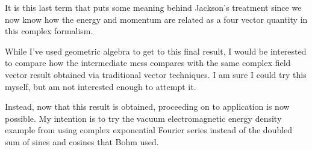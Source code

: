 It is this last term that puts some meaning behind Jackson's treatment since we now know how the energy and momentum are related as a four vector quantity in this complex formalism.  

While I've used geometric algebra to get to this final result, I would be interested to compare how the intermediate mess compares with the same complex field vector result obtained via traditional vector techniques.  I am sure I could try this myself, but am not interested enough to attempt it.

Instead, now that this result is obtained, proceeding on to application is now possible.  My intention is to try the vacuum electromagnetic energy density example from \citep{bohm1989qt} using complex exponential Fourier series instead of the doubled sum of sines and cosines that Bohm used.

\EndArticle
